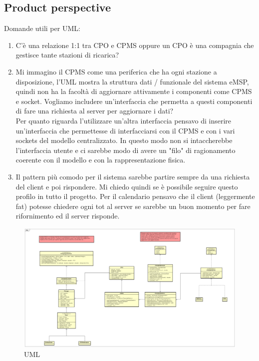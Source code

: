 \subsection{Product perspective}
Domande utili per UML:
\begin{enumerate}
    \item C'è una relazione 1:1 tra CPO e CPMS oppure un CPO è una compagnia che gestisce tante stazioni di ricarica?
    \item Mi immagino il CPMS come una periferica che ha ogni stazione a disposizione, l'UML mostra la struttura dati / funzionale del sistema eMSP, quindi non ha la facoltà di aggiornare attivamente i componenti come CPMS e socket. Vogliamo includere un'interfaccia che permetta a questi componenti di fare una richiesta al server per aggiornare i dati?\\
          Per quanto riguarda l'utilizzare un'altra interfaccia pensavo di inserire un'interfaccia che permettesse di interfacciarsi con il CPMS e con i vari sockets del modello centralizzato. In questo modo non si intaccherebbe l'interfaccia utente e ci sarebbe modo di avere un "filo" di ragionamento coerente con il modello e con la rappresentazione fisica.
    \item Il pattern più comodo per il sistema sarebbe partire sempre da una richiesta del client e poi rispondere. Mi chiedo quindi se è possibile seguire questo profilo in tutto il progetto. Per il calendario pensavo che il client (leggermente fat) potesse chiedere ogni tot al server se sarebbe un buon momento per fare rifornimento ed il server risponde.
\end{enumerate}
\begin{figure}[h!]
    \begin{center}
        \includegraphics[keepaspectratio, width=16cm]{UML.png}
        \caption{UML}
    \end{center}
\end{figure}
